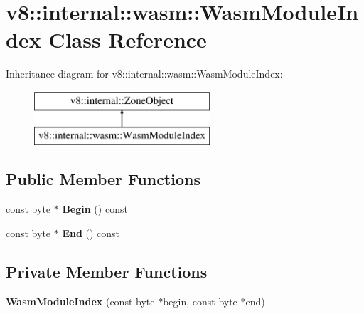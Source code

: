 \hypertarget{classv8_1_1internal_1_1wasm_1_1_wasm_module_index}{}\section{v8\+:\+:internal\+:\+:wasm\+:\+:Wasm\+Module\+Index Class Reference}
\label{classv8_1_1internal_1_1wasm_1_1_wasm_module_index}
Inheritance diagram for v8\+:\+:internal\+:\+:wasm\+:\+:Wasm\+Module\+Index\+:\begin{figure}[H]
\begin{center}
\leavevmode
\includegraphics[height=2.000000cm]{classv8_1_1internal_1_1wasm_1_1_wasm_module_index}
\end{center}
\end{figure}
\subsection*{Public Member Functions}
\begin{DoxyCompactItemize}
\item 
const byte $\ast$ {\bfseries Begin} () const \hypertarget{classv8_1_1internal_1_1wasm_1_1_wasm_module_index_a1949c49b3ecf94dd3ed2c27d693081e7}{}\label{classv8_1_1internal_1_1wasm_1_1_wasm_module_index_a1949c49b3ecf94dd3ed2c27d693081e7}

\item 
const byte $\ast$ {\bfseries End} () const \hypertarget{classv8_1_1internal_1_1wasm_1_1_wasm_module_index_a689d0f1c769048c92aa9f873a8f153cc}{}\label{classv8_1_1internal_1_1wasm_1_1_wasm_module_index_a689d0f1c769048c92aa9f873a8f153cc}

\end{DoxyCompactItemize}
\subsection*{Private Member Functions}
\begin{DoxyCompactItemize}
\item 
{\bfseries Wasm\+Module\+Index} (const byte $\ast$begin, const byte $\ast$end)\hypertarget{classv8_1_1internal_1_1wasm_1_1_wasm_module_index_af3e760172192fd04f8d2da367ca01718}{}\label{classv8_1_1internal_1_1wasm_1_1_wasm_module_index_af3e760172192fd04f8d2da367ca01718}

\end{DoxyCompactItemize}
